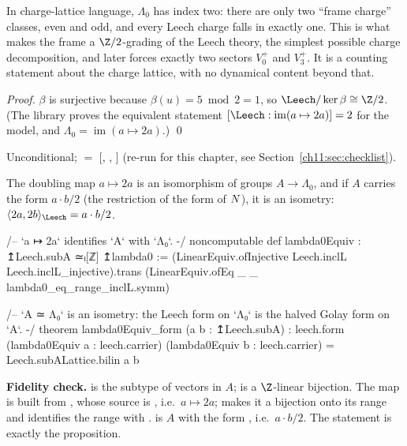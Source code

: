 \begin{physics}
In charge-lattice language, $\Lambda_0$ has index two: there are only two ``frame charge'' classes, even and odd, and every Leech charge falls in exactly one. This is what makes the frame a $\Z/2$-grading of the Leech theory, the simplest possible charge decomposition, and later forces exactly two sectors $V_0^+$ and $V_3^+$. It is a counting statement about the charge lattice, with no dynamical content beyond that.
\end{physics}
\emph{Proof.}  $\beta$ is surjective because $\beta(u)=5\bmod2=1$, so $\Leech/\ker\beta\cong\Z/2$.
(The library proves the equivalent statement $[\Leech:\operatorname{im}(a\mapsto2a)]=2$ for the
model, and $\Lambda_0=\operatorname{im}(a\mapsto 2a)$.) \qed
\begin{status}
Unconditional;  $=$ [,
, ] (re-run for this chapter, see
Section~\ref{ch11:sec:checklist}).
\end{status}

\begin{proposition}\label{ch11:prop:lambda0equiv}
The doubling map $a\mapsto 2a$ is an isomorphism of groups $A\to\Lambda_0$, and if $A$ carries the
form $a\cdot b/2$ (the restriction of the form of $N$), it is an isometry:
$\langle 2a,2b\rangle_\Leech=a\cdot b/2$.
\end{proposition}
\begin{leancode}
/-- `a ↦ 2a` identifies `A` with `Λ₀`. -/
noncomputable def lambda0Equiv : ↥Leech.subA ≃ₗ[ℤ] ↥lambda0 :=
  (LinearEquiv.ofInjective Leech.inclL Leech.inclL_injective).trans
    (LinearEquiv.ofEq _ _ lambda0_eq_range_inclL.symm)

/-- `A ≃ Λ₀` is an isometry: the Leech form on `Λ₀` is the halved Golay form on `A`. -/
theorem lambda0Equiv_form (a b : ↥Leech.subA) :
    leech.form (lambda0Equiv a : leech.carrier) (lambda0Equiv b : leech.carrier)
      = Leech.subALattice.bilin a b
\end{leancode}
\begin{dictionary}
\textbf{Fidelity check.}   is the subtype of vectors in $A$;  is a
$\Z$-linear bijection.  The map is built from , whose source is
, i.e.\ $a\mapsto 2a$;  makes it
a bijection onto its range and  identifies the range with .
 is $A$ with the form , i.e.\ $a\cdot b/2$.  The
statement is exactly the proposition.
\end{dictionary}

